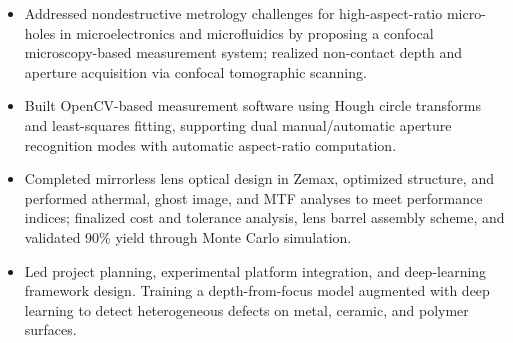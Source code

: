 \documentclass{resume}
\begin{document}

\begin{itemize}[parsep=0.5ex]
\item Addressed nondestructive metrology challenges for high-aspect-ratio micro-holes in microelectronics and microfluidics by proposing a confocal microscopy-based measurement system; realized non-contact depth and aperture acquisition via confocal tomographic scanning.
\item Built OpenCV-based measurement software using Hough circle transforms and least-squares fitting, supporting dual manual/automatic aperture recognition modes with automatic aspect-ratio computation.
\end{itemize}

\begin{itemize}[parsep=0.5ex]
\item Completed mirrorless lens optical design in Zemax, optimized structure, and performed athermal, ghost image, and MTF analyses to meet performance indices; finalized cost and tolerance analysis, lens barrel assembly scheme, and validated 90\% yield through Monte Carlo simulation.
\end{itemize}

\begin{itemize}[parsep=0.5ex]
  \item Led project planning, experimental platform integration, and deep-learning framework design. Training a depth-from-focus model augmented with deep learning to detect heterogeneous defects on metal, ceramic, and polymer surfaces.
\end{itemize}
\end{document}
